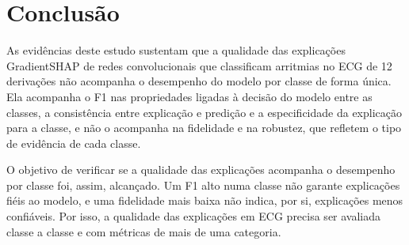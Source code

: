 \section{Conclusão}\label{sec:conclusao}

As evidências deste estudo sustentam que a qualidade das explicações GradientSHAP de redes convolucionais que classificam arritmias no ECG de 12 derivações não acompanha o desempenho do modelo por classe de forma única. Ela acompanha o F1 nas propriedades ligadas à decisão do modelo entre as classes, a consistência entre explicação e predição e a especificidade da explicação para a classe, e não o acompanha na fidelidade e na robustez, que refletem o tipo de evidência de cada classe.

O objetivo de verificar se a qualidade das explicações acompanha o desempenho por classe foi, assim, alcançado. Um F1 alto numa classe não garante explicações fiéis ao modelo, e uma fidelidade mais baixa não indica, por si, explicações menos confiáveis. Por isso, a qualidade das explicações em ECG precisa ser avaliada classe a classe e com métricas de mais de uma categoria.

